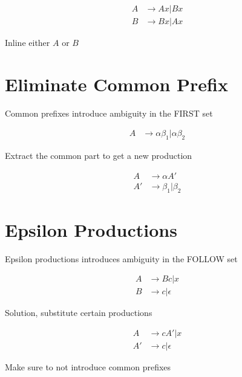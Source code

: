     \begin{align*}
      A &\to Ax | Bx \\
      B &\to Bx | Ax
    \end{align*}

    Inline either $ A $ or $ B $

\section{Eliminate Common Prefix}
\label{section: grammar/eliminate common prefix}

  Common prefixes introduce ambiguity in the FIRST set

  \begin{align*}
    A &\to \alpha \beta_{1} | \alpha \beta_{2}
  \end{align*}

  Extract the common part to get a new production

  \begin{align*}
    A &\to \alpha A' \\
    A' &\to \beta_{1} | \beta_{2}
  \end{align*}

\section{Epsilon Productions}

  Epsilon productions introduces ambiguity in the FOLLOW set

  \begin{align*}
    A &\to Bc | x \\
    B &\to c | \epsilon
  \end{align*}

  Solution, substitute certain productions

  \begin{align*}
    A &\to c A' | x \\
    A' &\to c | \epsilon
  \end{align*}

  Make sure to not introduce common prefixes
